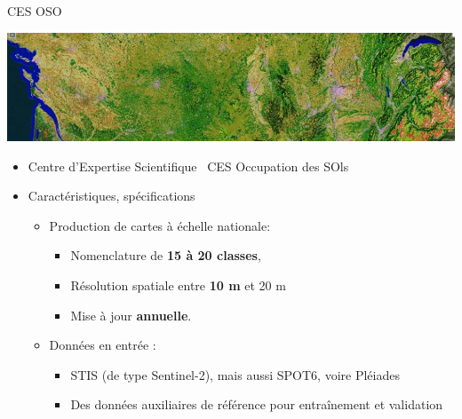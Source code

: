 \documentclass[pressentation,10pt,aspectratio=1610, xcolor=table]{beamer}
\begin{document}
\begin{frame}[label={sec:orgde6693c}]{CES OSO}
\begin{center}
\includegraphics[width=0.8\linewidth]{./figures/imagesat_oso.jpg}
\end{center}

\begin{itemize}
\item Centre d'Expertise Scientifique \og~CES Occupation des SOls\fg
\item Caractéristiques, spécifications
\begin{itemize}
\item Production de cartes à échelle nationale:
\begin{itemize}
\item Nomenclature de \textbf{15 à 20 classes},
\item Résolution spatiale entre \textbf{10 m} et 20 m
\item Mise à jour \textbf{annuelle}.
\end{itemize}
\item Données en entrée :
\begin{itemize}
\item STIS (de type Sentinel-2), mais aussi SPOT6, voire Pléiades
\item Des données auxiliaires de référence pour entraînement et validation
\end{itemize}
\end{itemize}
\end{itemize}
\end{frame}
\end{document}
